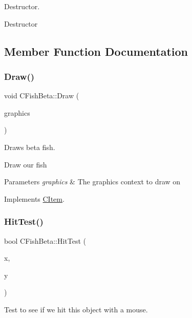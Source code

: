 Destructor. 

Destructor 

\subsection{Member Function Documentation}
\mbox{\label{class_c_fish_beta_ae2effbff7b98bb3cd6e1070d61d5366e}} 
\subsubsection{\texorpdfstring{Draw()}{Draw()}}
{\footnotesize\ttfamily void C\+Fish\+Beta\+::\+Draw (\begin{DoxyParamCaption}\item[{Gdiplus\+::\+Graphics $\ast$}]{graphics }\end{DoxyParamCaption})\hspace{0.3cm}{\ttfamily [virtual]}}



Draws beta fish. 

Draw our fish 
\begin{DoxyParams}{Parameters}
{\em graphics} & The graphics context to draw on \\
\hline
\end{DoxyParams}


Implements \hyperlink{class_c_item_a7ef8448d0c4bc53d0f1943a4dc817f6f}{C\+Item}.

\mbox{\label{class_c_fish_beta_a5bdd3d07a57ca1f01a7f2c5c00e0a662}} 
\subsubsection{\texorpdfstring{Hit\+Test()}{HitTest()}}
{\footnotesize\ttfamily bool C\+Fish\+Beta\+::\+Hit\+Test (\begin{DoxyParamCaption}\item[{int}]{x,  }\item[{int}]{y }\end{DoxyParamCaption})\hspace{0.3cm}{\ttfamily [virtual]}}



Test to see if we hit this object with a mouse. 

